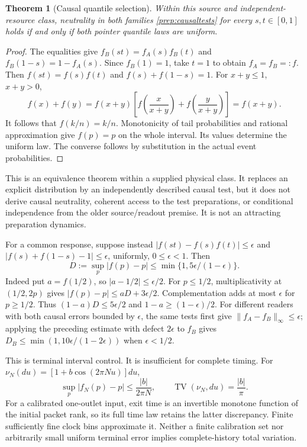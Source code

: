 \documentclass[11pt,oneside,openany]{book}
\newtheorem{theorem}{Theorem}[chapter]
\theoremstyle{definition}
\theoremstyle{remark}\newtheorem{remark}[theorem]{Remark}
\begin{document}
\begin{theorem}[Causal quantile selection]\label{prep:causal}
Within this source and independent-resource class, neutrality in both
families \eqref{prep:causaltests} for every $s,t\in[0,1]$ holds
if and only if both pointer quantile laws are uniform.
\end{theorem}
\begin{proof}
The equalities give
$f_B(st)=f_A(s)f_B(t)$ and $f_B(1-s)=1-f_A(s)$.
Since $f_B(1)=1$, take $t=1$ to obtain $f_A=f_B=:f$.
Then $f(st)=f(s)f(t)$ and $f(s)+f(1-s)=1$.
For $x+y\le1$, $x+y>0$,
\[
 f(x)+f(y)
 =f(x+y)\left[f\!\left(\frac{x}{x+y}\right)
             +f\!\left(\frac{y}{x+y}\right)\right]
 =f(x+y).
\]
It follows that $f(k/n)=k/n$. Monotonicity of tail probabilities and
rational approximation give $f(p)=p$ on the whole interval.
Its values determine the uniform law. The converse follows by substitution
in the actual event probabilities.
\end{proof}

This is an equivalence theorem within a supplied physical class. It replaces
an explicit distribution by an independently described causal test, but it
does not derive causal neutrality, coherent access to the test preparations,
or conditional independence from the older source/readout premise.
It is not an attracting preparation dynamics.

For a common response, suppose instead
$|f(st)-f(s)f(t)|\le\epsilon$ and
$|f(s)+f(1-s)-1|\le\epsilon$, uniformly, $0\le\epsilon<1$.
Then
\begin{equation}
 D:=\sup_p|f(p)-p|\le\min\{1,5\epsilon/(1-\epsilon)\}.
 \label{prep:causalerror}
\end{equation}
Indeed put $a=f(1/2)$, so $|a-1/2|\le\epsilon/2$.
For $p\le1/2$, multiplicativity at $(1/2,2p)$ gives
$|f(p)-p|\le aD+3\epsilon/2$. Complementation adds at most
$\epsilon$ for $p\ge1/2$. Thus
$(1-a)D\le5\epsilon/2$ and $1-a\ge(1-\epsilon)/2$.
For different readers with both causal errors bounded by $\epsilon$,
the same tests first give $\|f_A-f_B\|_\infty\le\epsilon$; applying
the preceding estimate with defect $2\epsilon$ to $f_B$ gives
$D_B\le\min(1,10\epsilon/(1-2\epsilon))$ when $\epsilon<1/2$.

This is terminal interval control. It is insufficient for complete timing.
For $\nu_N(du)=[1+b\cos(2\pi Nu)]du$,
\[
 \sup_p|f_N(p)-p|\le\frac{|b|}{2\pi N},\qquad
 \operatorname{TV}(\nu_N,du)=\frac{|b|}{\pi}.
\]
For a calibrated one-outlet input, exit time is an invertible monotone
function of the initial packet rank, so its full time law retains the
latter discrepancy. Finite sufficiently fine clock bins approximate it.
Neither a finite calibration set nor arbitrarily small uniform terminal
error implies complete-history total variation.
\end{document}
